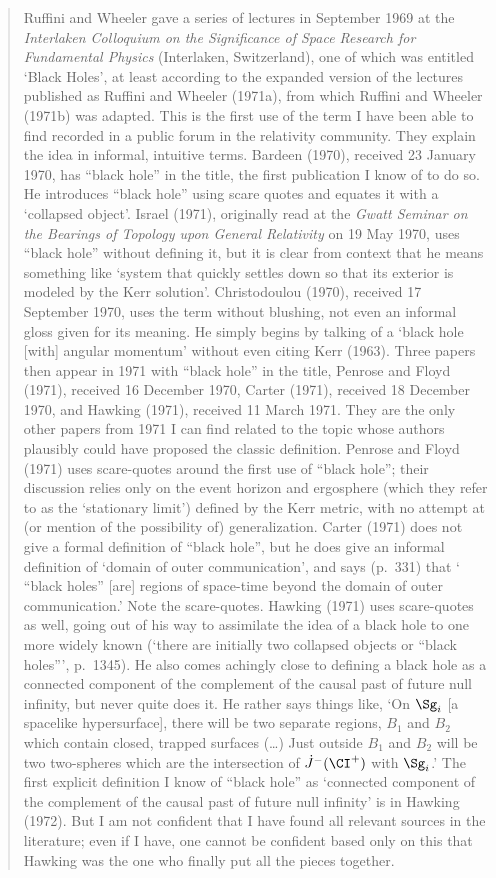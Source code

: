 \documentclass[11pt,a4paper]{article}
\begin{document}
\begin{quote}
\begin{small}
Ruffini and Wheeler gave a series of lectures in September 1969 at the \emph{Interlaken Colloquium on
the Significance of Space Research for Fundamental Physics} (Interlaken, Switzerland), one of which
was entitled `Black Holes', at least according to the expanded version of the lectures published as
Ruffini and Wheeler (1971a), from which Ruffini and Wheeler (1971b) was adapted. This is the first
use of the term I have been able to find recorded in a public forum in the relativity community.
They explain the idea in informal, intuitive terms. Bardeen (1970), received 23 January 1970,
has ``black hole'' in the title, the first publication I know of to do so. He introduces ``black hole''
using scare quotes and equates it with a `collapsed object'. Israel (1971), originally read at 
 the \emph{Gwatt Seminar on the Bearings of
Topology upon General Relativity} on 19 May 1970, uses ``black hole'' without defining it, but it is clear from context that he
means something like `system that quickly settles down so that its exterior is modeled by the Kerr
solution'.  Christodoulou (1970), received 17 September 1970, uses the term without blushing,
not even an informal gloss given for its meaning. He simply begins by talking of a `black hole
[with] angular momentum' without even citing Kerr (1963). Three papers then appear in 1971
with ``black hole'' in the title, Penrose and Floyd (1971), received 16 December 1970, Carter (1971),
received 18 December 1970, and Hawking (1971), received 11 March 1971. They are the only other
papers from 1971 I can find related to the topic whose authors plausibly could have proposed
the classic definition. Penrose and Floyd (1971) uses scare-quotes around the first use of ``black
hole''; their discussion relies only on the event horizon and ergosphere (which they refer to as the
`stationary limit') defined by the Kerr metric, with no attempt at (or mention of the possibility
of) generalization. Carter (1971) does not give a formal definition of ``black hole'', but he does give
an informal definition of `domain of outer communication', and says (p.\ 331) that `\! ``black holes''
[are] regions of space-time beyond the domain of outer communication.' Note the scare-quotes.
Hawking (1971) uses scare-quotes as well, going out of his way to assimilate the idea of a black
hole to one more widely known (`there are initially two collapsed objects or ``black holes''', p.\ 1345).
He also comes achingly close to defining a black hole as a connected component of the complement
of the causal past of future null infinity, but never quite does it. He rather says things like, 
`On $\Sg_i$ [a spacelike hypersurface], there will be two separate regions, $B_1$ and $B_2$ which contain closed,
trapped surfaces (\ldots)  Just outside $B_1$ and $B_2$ will be two two-spheres which are the intersection
of $\dot{J}^-(\CI^+)$ with $\Sg_i$.' The first explicit definition I know of ``black hole'' as `connected component of the complement of the causal past of future null infinity' is in Hawking (1972). But I am not
confident that I have found all relevant sources in the literature; even if I have, one cannot be
confident based only on this that Hawking was the one who finally put all the pieces together.
 

\end{small}
\end{quote}
\end{document}
